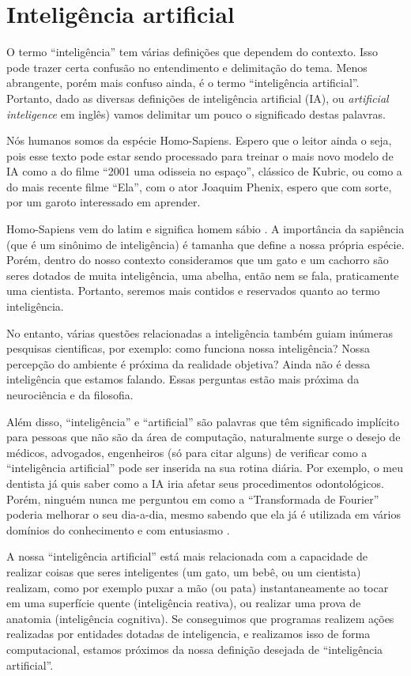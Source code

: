 \documentclass[a4paper,12pt]{book}
\begin{document}
	\section{Inteligência artificial}

	O termo ``inteligência'' tem várias definições que dependem do contexto. Isso pode trazer certa confusão no entendimento e delimitação do tema. Menos abrangente, porém mais confuso ainda, é o termo ``inteligência artificial''. Portanto, dado as diversas definições de inteligência artificial (IA), ou \textit{artificial inteligence} em inglês) vamos delimitar um pouco o significado destas palavras.

	Nós humanos somos da espécie Homo-Sapiens. Espero que o leitor ainda o seja, pois esse texto pode estar sendo processado para treinar o mais novo modelo de IA como a do filme ``2001 uma odisseia no espaço'', clássico de Kubric, ou como a do mais recente filme ``Ela'', com o ator Joaquim Phenix, espero que com sorte, por um garoto interessado em aprender.

	Homo-Sapiens vem do latim e significa homem sábio \cite{wikipediahumano}. A importância da sapiência (que é um sinônimo de inteligência) é tamanha que define a nossa própria espécie. Porém, dentro do nosso contexto consideramos que um gato e um cachorro são seres dotados de muita inteligência, uma abelha, então nem se fala, praticamente uma cientista. Portanto, seremos mais contidos e reservados quanto ao termo inteligência.

	No entanto, várias questões relacionadas a inteligência também guiam inúmeras pesquisas cientificas, por exemplo: como funciona nossa inteligência? Nossa percepção do ambiente é próxima da realidade objetiva? Ainda não é dessa inteligência que estamos falando. Essas perguntas estão mais próxima da neurociência e da filosofia.

	Além disso, ``inteligência'' e ``artificial'' são palavras que têm significado implícito para pessoas que não são da área de computação, naturalmente surge o desejo de médicos, advogados, engenheiros (só para citar alguns) de verificar como a “inteligência artificial” pode ser inserida na sua rotina diária. Por exemplo, o meu dentista já quis saber como a IA iria afetar seus procedimentos odontológicos. Porém, ninguém nunca me perguntou em como a ``Transformada de Fourier'' poderia melhorar o seu dia-a-dia, mesmo sabendo que ela já é utilizada em vários domínios do conhecimento e com entusiasmo \cite{wikipediafourier}.

	A nossa ``inteligência artificial'' está mais relacionada com a capacidade de realizar coisas que seres inteligentes (um gato, um bebê, ou um cientista) realizam, como por exemplo puxar a mão (ou pata) instantaneamente ao tocar em uma superfície quente (inteligência reativa), ou realizar uma prova de anatomia (inteligência cognitiva). Se conseguimos que programas realizem ações realizadas por entidades dotadas de inteligencia, e realizamos isso  de forma computacional, estamos próximos da nossa definição desejada de ``inteligência artificial''.
\end{document}
